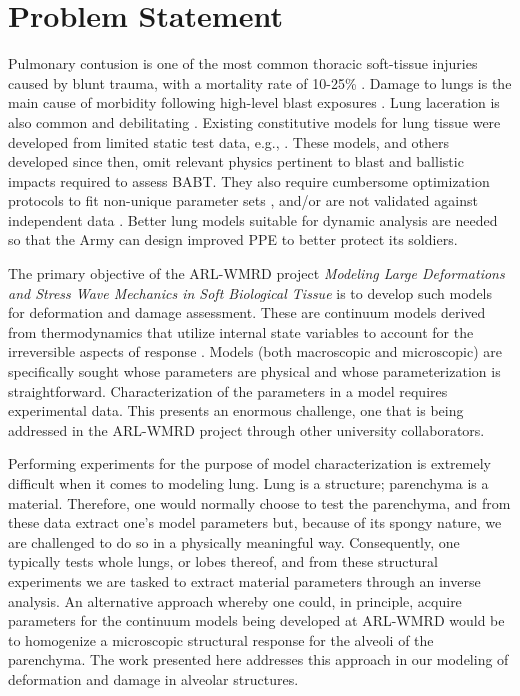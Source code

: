 \section{Problem Statement}

Pulmonary contusion is one of the most common thoracic soft-tissue injuries caused by blunt trauma, with a mortality rate of 10-25\% \citep{Stitzeletal05}.  Damage to lungs is the main cause of morbidity following high-level blast exposures \citep{Stuhmilleretal88}.  Lung laceration is also common and debilitating \citep{VlessisTrunkey97}.  Existing constitutive models for lung tissue were developed from limited static test data, e.g., \cite{Fungetal78,Vawteretal79,Vawter80}.  These models, and others developed since then, omit relevant physics pertinent to blast and ballistic impacts required to assess BABT.  They also require cumbersome optimization protocols to fit non-unique parameter sets \citep{Gayziketal07,Gayziketal11}, and\slash or are not validated against independent data \citep{Yuenetal08}.  Better lung models suitable for dynamic analysis are needed so that the Army can design improved PPE to better protect its soldiers.

The primary objective of the ARL-WMRD project \textit{Modeling Large Deformations and Stress Wave Mechanics in Soft Biological Tissue\/} is to develop such models for deformation and damage assessment.  These are continuum models derived from thermo\-dynamics that utilize internal state variables to account for the irreversible aspects of response \cite{ClaytonFreed19}.  Models (both macro\-scopic and micro\-scopic) are specifically sought whose parameters are physical and whose parameterization is straightforward.  Characterization of the parameters in a model requires experimental data.  This presents an enormous challenge, one that is being addressed in the ARL-WMRD project through other university collaborators.  

Performing experiments for the purpose of model characterization is extremely difficult when it comes to modeling lung.  Lung is a structure; parenchyma is a material.  Therefore, one would normally choose to test the parenchyma, and from these data extract one's model parameters but, because of its spongy nature, we are challenged to do so in a physically meaningful way.  Consequently, one typically tests whole lungs, or lobes thereof, and from these structural experiments we are tasked to extract material parameters through an inverse analysis.  An alternative approach whereby one could, in principle, acquire parameters for the continuum models being developed at ARL-WMRD would be to homo\-genize a microscopic structural response for the alveoli of the parenchyma.  The work presented here addresses this approach in our modeling of deformation and damage in alveolar structures.

